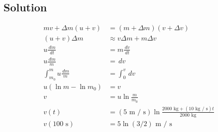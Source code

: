 \documentclass[solutions]{esg8012pset}
\renewcommand{\d}{\,d}
\begin{document}
\subsection*{Solution}
  \begin{align*}
   m v + \Delta m (u + v) & = (m + \Delta m) (v + \Delta v) \\
   (u + v)\Delta m & \approx v\Delta m + m\Delta v \\
   u\frac{\d m}{\d t} & = m\frac{\d v}{\d t} \\
   u\frac{\d m}{m} & = \d v \\
   \int_{m_0}^{m} u\frac{\d m}{m} & = \int_{0}^{v} \d v \\
   u(\ln m - \ln m_0) & = v \\
   v & = u\ln\frac{m}{m_0} \\
   v(t) & = (5\text{ m / s})\ln\frac{2000\text{ kg} + (10\text{ kg / s})t}{2000\text{ kg}} \\
   v(100\text{ s}) %
    & = 5\ln(3 / 2)\text{ m / s}
  \end{align*}
\end{document}
